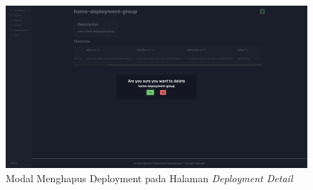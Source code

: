 \begin{figure}[ht]
  \centering
  \includegraphics[width=1\textwidth]{resources/chapter-4/dashboard/deployment-detail-delete.jpg}
  \caption{Modal Menghapus Deployment pada Halaman \textit{Deployment Detail}}
  \label{fig:halaman-deployment-detail-delete}
\end{figure}